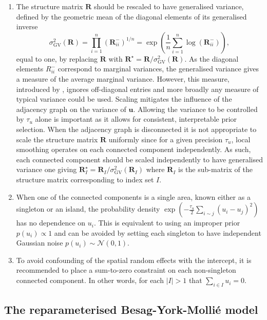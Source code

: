 \documentclass[a4paper, nobind]{templates/ociamthesis}
\providecommand{\tightlist}{%
  \setlength{\itemsep}{0pt}\setlength{\parskip}{0pt}}
\newcommand{\bu}{\mathbf{u}}
\begin{document}
\begin{enumerate}
\def\labelenumi{\arabic{enumi}.}
\tightlist
\item
  The structure matrix \(\mathbf{R}\) should be rescaled to have generalised variance, defined by the geometric mean of the diagonal elements of its generalised inverse
  \begin{equation}
   \sigma^2_{\text{GV}}(\mathbf{R}) = \prod_{i = 1}^n (\mathbf{R}^-_{ii})^{1/n} = \exp \left( \frac{1}{n} \sum_{i = 1}^n \log (\mathbf{R}^-_{ii}) \right),
  \end{equation}
  equal to one, by replacing \(\mathbf{R}\) with \(\mathbf{R}^\star = \mathbf{R} / \sigma^2_{\text{GV}}(\mathbf{R})\).
  As the diagonal elements \(R^-_{ii}\) correspond to marginal variances, the generalised variance gives a measure of the average marginal variance.
  However, this measure, introduced by \textcite{sorbye2014scaling}, ignores off-diagonal entries and more broadly any measure of typical variance could be used.
  Scaling mitigates the influence of the adjacency graph on the variance of \(\bu\).
  Allowing the variance to be controlled by \(\tau_u\) alone is important as it allows for consistent, interpretable prior selection.
  When the adjacency graph is disconnected it is not appropriate to scale the structure matrix \(\mathbf{R}\) uniformly since for a given precision \(\tau_u\), local smoothing operates on each connected component independently.
  As such, each connected component should be scaled independently to have generalised variance one giving \(\mathbf{R}^\star_I = \mathbf{R}_I / \sigma^2_{\text{GV}}(\mathbf{R}_I)\) where \(\mathbf{R}_I\) is the sub-matrix of the structure matrix corresponding to index set \(I\).
\item
  When one of the connected components is a single area, known either as a singleton or an island, the probability density \(\exp \left( -\frac{\tau_u}{2} \sum_{i \sim j} (u_i - u_j)^2 \right)\) has no dependence on \(u_i\).
  This is equivalent to using an improper prior \(p(u_i) \propto 1\) and can be avoided by setting each singleton to have independent Gaussian noise \(p(u_i) \sim \mathcal{N}(0, 1)\).
\item
  To avoid confounding of the spatial random effects with the intercept, it is recommended to place a sum-to-zero constraint on each non-singleton connected component.
  In other words, for each \(|I| > 1\) that \(\sum_{i \in I} u_i = 0\).
\end{enumerate}

\hypertarget{the-reparameterised-besag-york-molliuxe9-model}{%
\subsection{The reparameterised Besag-York-Mollié model}\label{the-reparameterised-besag-york-molliuxe9-model}}
\end{document}
